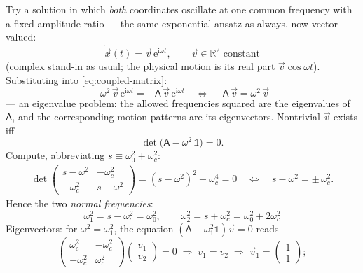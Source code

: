 \documentclass[11pt]{article}
\theoremstyle{plain}
\theoremstyle{definition}
\theoremstyle{remark}
\newcommand{\ee}{\mathrm{e}}
\newcommand{\ii}{\mathrm{i}}
\newcommand{\vx}{\vec{x}}
\newcommand{\vv}{\vec{v}}
\newcommand{\mA}{\mathsf{A}}
\begin{document}
Try a solution in which \emph{both} coordinates oscillate at one common
frequency with a fixed amplitude ratio --- the same exponential ansatz as
always, now vector-valued:
\begin{equation}
  \tilde\vx(t) = \vv\,\ee^{\ii\omega t},
  \qquad \vv\in\mathbb{R}^2 \text{ constant}
\end{equation}
(complex stand-in as usual; the physical motion is its real part
$\vv\cos\omega t$).
Substituting into \eqref{eq:coupled-matrix}:
\begin{equation}
  -\omega^2\, \vv\,\ee^{\ii\omega t} = -\mA\,\vv\,\ee^{\ii\omega t}
  \quad\Longleftrightarrow\quad
  \boxed{\;\mA\,\vv = \omega^2\,\vv\;}
\end{equation}
--- an eigenvalue problem: the allowed frequencies squared are the
eigenvalues of $\mA$, and the corresponding motion patterns are its
eigenvectors. Nontrivial $\vv$ exists iff
\begin{equation}
  \det\bigl(\mA - \omega^2\,\mathbb{1}\bigr) = 0 .
\end{equation}
Compute, abbreviating $s \equiv \omega_0^2+\omega_c^2$:
\begin{align}
  \det\begin{pmatrix} s - \omega^2 & -\omega_c^2 \\ -\omega_c^2 & s-\omega^2\end{pmatrix}
  = (s-\omega^2)^2 - \omega_c^4
  = 0
  \quad\Longleftrightarrow\quad
  s - \omega^2 = \pm\,\omega_c^2 .
\end{align}
Hence the two \emph{normal frequencies}:
\begin{equation}
  \boxed{\;
  \omega_1^2 = s - \omega_c^2 = \omega_0^2,
  \qquad
  \omega_2^2 = s + \omega_c^2 = \omega_0^2 + 2\omega_c^2
  \;}
\end{equation}
Eigenvectors: for $\omega^2 = \omega_1^2$, the equation
$(\mA - \omega_1^2\mathbb 1)\vv=0$ reads
\begin{equation}
  \begin{pmatrix} \omega_c^2 & -\omega_c^2 \\ -\omega_c^2 & \omega_c^2 \end{pmatrix}
  \begin{pmatrix} v_1 \\ v_2 \end{pmatrix} = 0
  \;\Longrightarrow\;
  v_1 = v_2
  \;\Longrightarrow\;
  \vv_1 = \begin{pmatrix} 1\\1 \end{pmatrix};
\end{equation}
\end{document}
